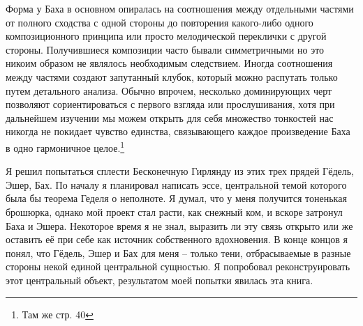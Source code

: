 \documentclass[../main.tex]{subfiles}
\begin{document}
Форма у Баха в основном опиралась на соотношения между отдельными частями от полного сходства с одной стороны до повторения какого-либо одного композиционного принципа или просто мелодической переклички с другой стороны. Получившиеся композиции часто бывали симметричными но это никоим образом не являлось необходимым следствием. Иногда соотношения между частями создают запутанный клубок, который можно распутать только путем детального анализа. Обычно впрочем, несколько доминирующих черт позволяют сориентироваться с первого взгляда или прослушивания, хотя при дальнейшем изучении мы можем открыть для себя множество тонкостей нас никогда не покидает чувство единства, связывающего каждое произведение Баха в одно гармоничное целое.\footnote{Там же стр. 40}

Я решил попытаться сплести Бесконечную Гирлянду из этих трех прядей Гёдель, Эшер, Бах. По началу я планировал написать эссе, центральной темой которого была бы теорема Геделя о неполноте. Я думал, что у меня получится тоненькая брошюрка, однако мой проект стал расти, как снежный ком, и вскоре затронул Баха и Эшера. Некоторое время я не знал, выразить ли эту связь открыто или же оставить её при себе как источник собственного вдохновения. В конце концов я понял, что Гёдель, Эшер и Бах для меня \--- только тени, отбрасываемые в разные стороны некой единой центральной сущностью. Я попробовал реконструировать этот центральный объект, результатом моей попытки явилась эта книга.
\end{document}
